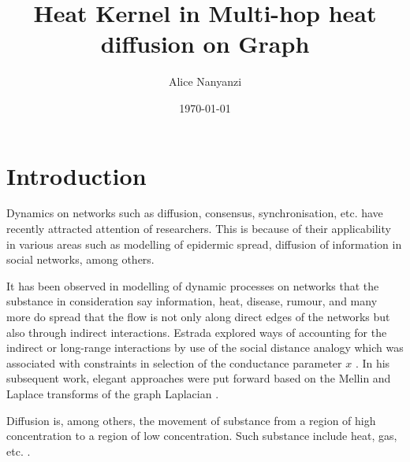 \documentclass[12pt]{article}
\begin{document}
\title{Heat Kernel in Multi-hop heat diffusion on Graph}
\author{Alice Nanyanzi}
\date{\today}
\maketitle
{}

\section{Introduction}
Dynamics on networks such as diffusion, consensus, synchronisation, etc. have recently attracted attention of researchers. This is because of their applicability in various areas such as modelling of epidermic spread, diffusion of information in social networks, among others.

It has been observed in modelling of dynamic processes on networks that the substance in consideration say information, heat, disease, rumour, and many more do spread that the flow is not only along direct edges of the networks but also through indirect interactions. Estrada explored ways of accounting for the indirect or long-range interactions by use of the social distance analogy which was associated with constraints in selection of the conductance parameter $x$ \citep{estrada2011epidemic}. In his subsequent work, elegant approaches were put forward based on the Mellin and Laplace transforms of the graph Laplacian \citep{estrada2012path,estrada2017long}. 

Diffusion is, among others, the movement of substance from a region of high concentration to a region of low concentration. Such substance include heat, gas, etc. \citep{newman2010networks}.
\end{document}
